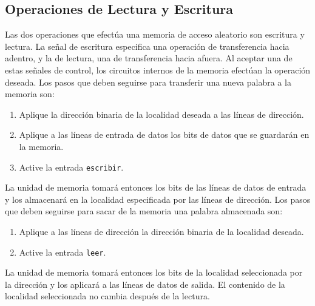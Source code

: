 \subsection{Operaciones de Lectura y Escritura}
Las dos operaciones que efectúa una memoria de acceso aleatorio son escritura y lectura. La señal de escritura especifica una operación de transferencia hacia adentro, y la de lectura, una de transferencia hacia afuera. Al aceptar una de estas señales de control, los circuitos internos de la memoria efectúan la operación deseada.
Los pasos que deben seguirse para transferir una nueva palabra a la memoria son:
\begin{enumerate}
    \item Aplique la dirección binaria de la localidad deseada a las líneas de dirección.
    \item Aplique a las líneas de entrada de datos los bits de datos que se guardarán en la memoria.
    \item Active la entrada \texttt{escribir}.
\end{enumerate}

La unidad de memoria tomará entonces los bits de las líneas de datos de entrada y los almacenará en la localidad especificada por las líneas de dirección.
Los pasos que deben seguirse para sacar de la memoria una palabra almacenada son:
\begin{enumerate}
    \item Aplique a las líneas de dirección la dirección binaria de la localidad deseada.
    \item Active la entrada \texttt{leer}.
\end{enumerate}

La unidad de memoria tomará entonces los bits de la localidad seleccionada por la dirección
y los aplicará a las líneas de datos de salida. El contenido de la localidad seleccionada no cambia después de la lectura.